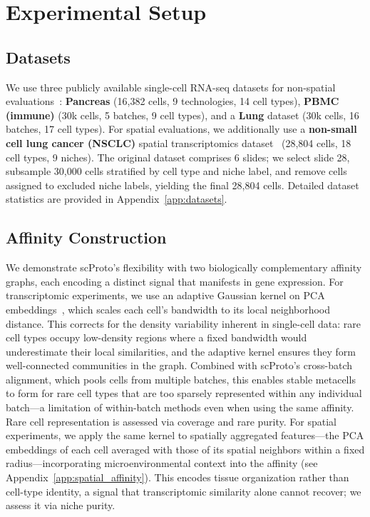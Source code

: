 \section{Experimental Setup}

\subsection{Datasets}

We use three publicly available single-cell RNA-seq datasets for non-spatial evaluations~\citep{luecken2020benchmarking}:
\textbf{Pancreas} (16,382 cells, 9 technologies, 14 cell types),
\textbf{PBMC (immune)} (30k cells, 5 batches, 9 cell types),
and a \textbf{Lung} dataset (30k cells, 16 batches, 17 cell types).
For spatial evaluations, we additionally use a \textbf{non-small cell lung cancer (NSCLC)} spatial transcriptomics dataset~\citep{pentimalli2025combining} (28,804 cells, 18 cell types, 9 niches).
The original dataset comprises 6 slides; we select slide 28, subsample 30,000 cells stratified by cell type and niche label, and remove cells assigned to excluded niche labels, yielding the final 28,804 cells.
Detailed dataset statistics are provided in Appendix~\ref{app:datasets}.

\subsection{Affinity Construction}

We demonstrate scProto's flexibility with two biologically complementary affinity graphs, each encoding a distinct signal that manifests in gene expression.
For transcriptomic experiments, we use an adaptive Gaussian kernel on PCA embeddings~\citep{seacells}, which scales each cell's bandwidth to its local neighborhood distance.
This corrects for the density variability inherent in single-cell data: rare cell types occupy low-density regions where a fixed bandwidth would underestimate their local similarities, and the adaptive kernel ensures they form well-connected communities in the graph.
Combined with scProto's cross-batch alignment, which pools cells from multiple batches, this enables stable metacells to form for rare cell types that are too sparsely represented within any individual batch---a limitation of within-batch methods even when using the same affinity.
Rare cell representation is assessed via coverage and rare purity.
For spatial experiments, we apply the same kernel to spatially aggregated features---the PCA embeddings of each cell averaged with those of its spatial neighbors within a fixed radius---incorporating microenvironmental context into the affinity (see Appendix~\ref{app:spatial_affinity}).
This encodes tissue organization rather than cell-type identity, a signal that transcriptomic similarity alone cannot recover; we assess it via niche purity.

